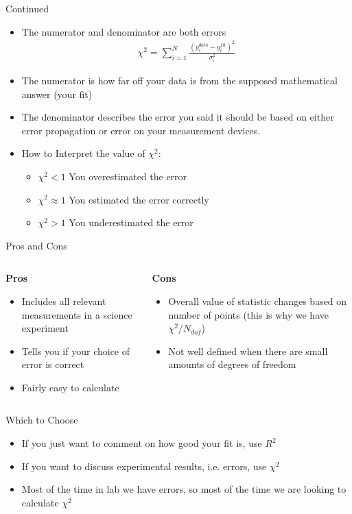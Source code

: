 \documentclass{beamer}
\begin{document}
\begin{frame}{Continued}
  \begin{itemize}
  \item The numerator and denominator are both errors
    \begin{align*}
      \chi^2=\sum_{i=1}^N\frac{(y_i^{data}-y_i^{fit})^2}{\sigma_i^2}
    \end{align*}
  \item The numerator is how far off your data is from the supposed mathematical answer (your fit)
  \item The denominator describes the error you said it should be based on either error propagation or error on your measurement devices.
  \item How to Interpret the value of $\chi^2$:
    \begin{itemize}
    \item $\chi^2<1$ You overestimated the error
    \item $\chi^2\approx1$ You estimated the error correctly
    \item $\chi^2>1$ You underestimated the error 
    \end{itemize}
  \end{itemize}
\end{frame}
\begin{frame}{Pros and Cons}
  \begin{columns}
    \begin{column}{0.5\textwidth}
      \textbf{Pros}
      \begin{itemize}
      \item Includes all relevant measurements in a science experiment
      \item Tells you if your choice of error is correct
      \item Fairly easy to calculate
      \end{itemize}
    \end{column}
    \begin{column}{0.5\textwidth}
      \textbf{Cons}
      \begin{itemize}
      \item Overall value of statistic changes based on number of points (this is why we have $\chi^2/N_{dof}$)
      \item Not well defined when there are small amounts of degrees of freedom
      \end{itemize}
    \end{column}
  \end{columns}
\end{frame}

\begin{frame}{Which to Choose}
  \begin{itemize}
  \item If you just want to comment on how good your fit is, use $R^2$
  \item If you want to discuss experimental results, i.e. errors, use $\chi^2$
  \item Most of the time in lab we have errors, so most of the time we are looking to calculate $\chi^2$
  \end{itemize}
\end{frame}
\end{document}
